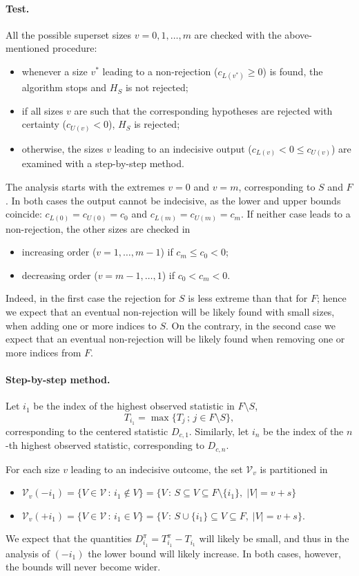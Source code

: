 \documentclass[11pt,a4paper,openright,twoside]{article}
\begin{document}
\vspace{3mm}
\paragraph{Test.} All the possible superset sizes $v=0,1,\ldots,m$ are checked with the above-mentioned procedure:
\begin{itemize}
\item whenever a size $v^*$ leading to a non-rejection ($c_{L(v^*)}\geq 0$) is found, the algorithm stops and $H_S$ is not rejected;
\item if all sizes $v$ are such that the corresponding hypotheses are rejected with certainty ($c_{U(v)}<0$), $H_S$ is rejected;
\item otherwise, the sizes $v$ leading to an indecisive output ($c_{L(v)}<0\leq c_{U(v)}$) are examined with a step-by-step method.
\end{itemize}

The analysis starts with the extremes $v=0$ and $v=m$, corresponding to $S$ and $F$. In both cases the output cannot be indecisive, as the lower and upper bounds coincide: $c_{L(0)}=c_{U(0)}=c_0$ and $c_{L(m)}=c_{U(m)}=c_m$. If neither case leads to a non-rejection, the other sizes are checked in
\begin{itemize}
\item increasing order ($v=1,\ldots,m-1$) if $c_{m}\leq c_{0}<0$;
\item decreasing order ($v=m-1,\ldots,1$) if $c_{0}< c_{m}<0$.
\end{itemize}
Indeed, in the first case the rejection for $S$ is less extreme than that for $F$; hence we expect that an eventual non-rejection will be likely found with small sizes, when adding one or more indices to $S$. On the contrary, in the second case we expect that an eventual non-rejection will be likely found when removing one or more indices from $F$.

\vspace{3mm}
\paragraph{Step-by-step method.} Let $i_1$ be the index of the highest observed statistic in $F\setminus S$,
\[T_{i_1}=\max\{T_j\,;\,j\in F\setminus S\},\]
corresponding to the centered statistic $D_{c,1}$. Similarly, let $i_n$ be the index of the $n$-th highest observed statistic, corresponding to $D_{c,n}$.

For each size $v$ leading to an indecisive outcome, the set $\mathcal{V}_v$ is partitioned in
\begin{itemize}
\item $\mathcal{V}_v(-i_1)=\{V\in\mathcal{V}\,:\,i_1\notin V\}=\{V\,:\,S\subseteq V\subseteq F\setminus\{i_1\},\;|V|=v+s\}$
\item $\mathcal{V}_v(+i_1)=\{V\in\mathcal{V}\,:\,i_1\in V\}=\{V\,:\,S\cup\{i_1\}\subseteq V\subseteq F,\;|V|=v+s\}$.
\end{itemize}
We expect that the quantities $D_{i_1}^{\pi}=T_{i_1}^{\pi}-T_{i_1}$ will likely be small, and thus in the analysis of $(-i_1)$ the lower bound will likely increase. In both cases, however, the bounds will never become wider.
\end{document}
